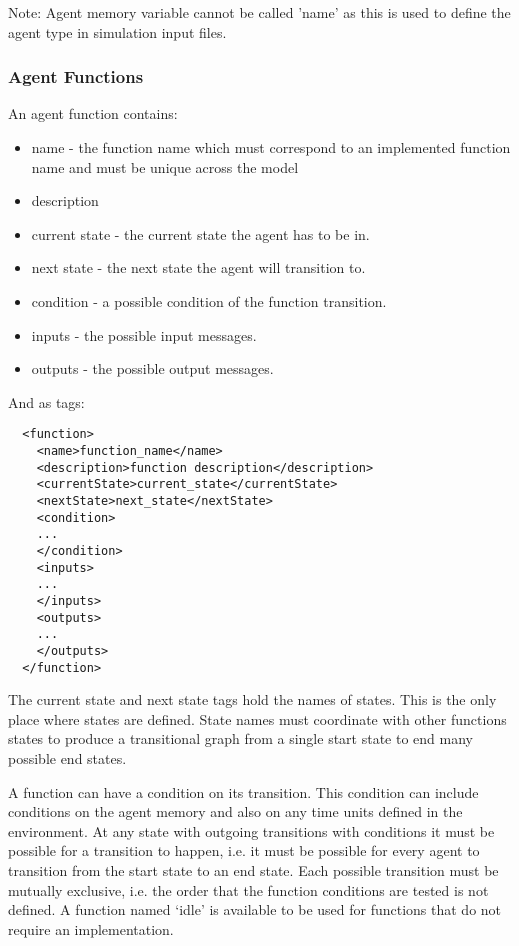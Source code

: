 Note: Agent memory variable cannot be called 'name' as this is used to define the agent type in simulation input files.

\subsubsection{Agent Functions}

An agent function contains:

\begin{itemize}
\item name - the function name which must correspond to an implemented function
name and must be unique across the model
\item description
\item current state - the current state the agent has to be in.
\item next state - the next state the agent will transition to.
\item condition - a possible condition of the function transition.
\item inputs - the possible input messages.
\item outputs - the possible output messages.
\end{itemize}

And as tags:

\begin{verbatim}
  <function>
    <name>function_name</name>
    <description>function description</description>
    <currentState>current_state</currentState>
    <nextState>next_state</nextState>
    <condition>
    ...
    </condition>
    <inputs>
    ...
    </inputs>
    <outputs>
    ...
    </outputs>
  </function>
\end{verbatim}

The current state and next state tags hold the names of states. This is the
only place where states are defined. State names must coordinate with other
functions states to produce a transitional graph from a single start state to
end many possible end states.

\label{functioncond}

A function can have a condition on its transition. This condition can include
conditions on the agent memory and also on any time units defined in the
environment. At any state with outgoing transitions with conditions it must be
possible for a transition to happen, i.e. it must be possible for every agent
to transition from the start state to an end state. Each possible transition
must be mutually exclusive, i.e. the order that the function conditions are
tested is not defined. A function named `idle' is available to be used for
functions that do not require an implementation.

